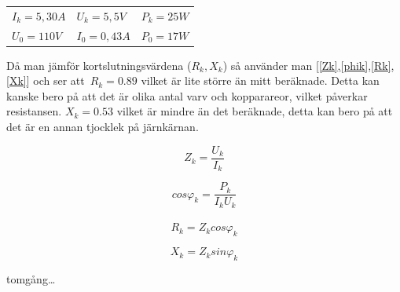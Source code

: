 \documentclass{article}
\begin{document}
\begin{tabular}{l l l}
  $I_k = 5,30 A$ & $U_k = 5,5 V $&$ P_k = 25 W$\\
  $U_0 = 110 V $&$ I_0 = 0,43 A $&$ P_0 = 17 W$\\
\end{tabular}

Då man jämför kortslutningsvärdena ($R_k,X_k$) så använder man [\ref{Zk},\ref{phik},\ref{Rk},\ref{Xk}] och ser att\
$R_k= 0.89$ vilket är lite större än mitt beräknade.
Detta kan kanske bero på att det är olika antal varv och kopparareor, vilket påverkar resistansen.
$X_k= 0.53$ vilket är mindre än det beräknade, detta kan bero på att det är en annan tjocklek på järnkärnan.

\begin{equation}
  Z_k=\frac{U_k}{I_k}
  \label{Zk}
\end{equation}

\begin{equation}
  cos\varphi_k=\frac{P_k}{I_k U_k}
  \label{phik}
\end{equation}
\\
\begin{equation}
  R_k=Z_kcos\varphi_k
  \label{Rk}
\end{equation}

\begin{equation}
  X_k=Z_ksin\varphi_k
  \label{Xk}
\end{equation}

tomgång\ldots








\end{document}

